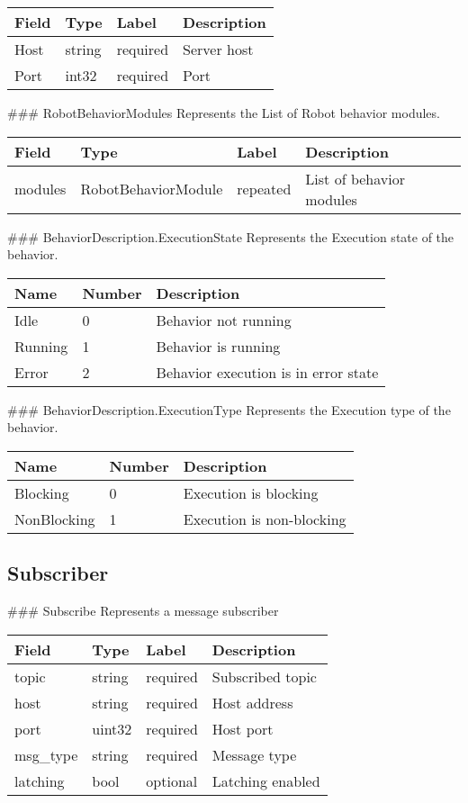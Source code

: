 \begin{longtable}[c]{@{}llll@{}}
\toprule
Field & Type & Label & Description\tabularnewline
\midrule
\endhead
Host & string & required & Server host\tabularnewline
Port & int32 & required & Port\tabularnewline
\bottomrule
\end{longtable}

 \#\#\# RobotBehaviorModules Represents the List of Robot behavior
modules.

\begin{longtable}[c]{@{}llll@{}}
\toprule
Field & Type & Label & Description\tabularnewline
\midrule
\endhead
modules & RobotBehaviorModule & repeated & List of behavior
modules\tabularnewline
\bottomrule
\end{longtable}

 \#\#\# BehaviorDescription.ExecutionState Represents the Execution
state of the behavior.

\begin{longtable}[c]{@{}lll@{}}
\toprule
Name & Number & Description\tabularnewline
\midrule
\endhead
Idle & 0 & Behavior not running\tabularnewline
Running & 1 & Behavior is running\tabularnewline
Error & 2 & Behavior execution is in error state\tabularnewline
\bottomrule
\end{longtable}

 \#\#\# BehaviorDescription.ExecutionType Represents the Execution type
of the behavior.

\begin{longtable}[c]{@{}lll@{}}
\toprule
Name & Number & Description\tabularnewline
\midrule
\endhead
Blocking & 0 & Execution is blocking\tabularnewline
NonBlocking & 1 & Execution is non-blocking\tabularnewline
\bottomrule
\end{longtable}

\subsection{Subscriber}\label{subscribe.proto}

 \#\#\# Subscribe Represents a message subscriber

\begin{longtable}[c]{@{}llll@{}}
\toprule
Field & Type & Label & Description\tabularnewline
\midrule
\endhead
topic & string & required & Subscribed topic\tabularnewline
host & string & required & Host address\tabularnewline
port & uint32 & required & Host port\tabularnewline
msg\_type & string & required & Message type\tabularnewline
latching & bool & optional & Latching enabled\tabularnewline
\bottomrule
\end{longtable}

